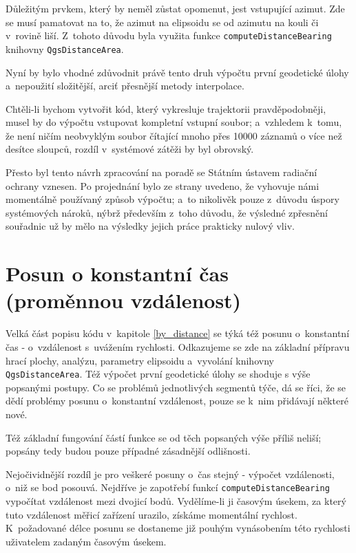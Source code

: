 Důležitým prvkem, který by neměl zůstat opomenut, jest vstupující azimut. Zde se musí pamatovat
na to, že azimut na elipsoidu se od azimutu na kouli či v~ro\-vině liší. Z~tohoto
důvodu byla využita funkce {\tt computeDistanceBearing} knihovny {\tt QgsDistanceArea}.

Nyní by bylo vhodné zdůvodnit právě tento druh výpočtu první geodetické úlohy a~nepoužití
složitější, arciť přesnější metody interpolace. 

Chtěli-li bychom vytvořit kód, který vykresluje trajektorii pravděpodobněji, mu\-sel by do
výpočtu vstupovat kompletní vstupní soubor; a~vzhledem k~tomu, že není ničím neobvyklým
soubor čítající mnoho přes 10000 záznamů o více než desítce sloupců, rozdíl v~systémové zátěži
by byl obrovský. 

Přesto byl tento návrh zpraco\-vá\-ní na poradě se Státním ústavem radiační ochra\-ny
vznesen. Po projednání bylo ze strany  uvedeno, že vyhovuje námi momentálně
používaný způsob výpočtu; a~to nikolivěk pouze z~důvodu úspory systémových nároků, nýbrž především
z~toho důvodu, že výsledné zpřesnění souřadnic už by mělo na výsledky jejich práce
prakticky nulový vliv. 

\section{Posun o konstantní čas (proměnnou vzdálenost)}
\label{by_seconds}

Velká část popisu kódu v~kapitole \ref{by_distance} se týká též posunu o~konstantní
čas - o~vzdále\-nost s~uvážením rychlosti. Odkazujeme se zde na základní přípravu hrací plochy,
analýzu, parametry elipsoidu a~vyvolání knihovny {\tt QgsDistanceArea}. Též výpočet první geodetické
úlohy se shoduje s výše popsanými postupy. Co se problémů jednotlivých
segmentů týče, dá se říci, že se dědí problémy posunu o~konstantní vzdálenost, pouze se k~nim
přidávají některé nové. 

Též základní fungování částí funkce se od těch popsaných výše příliš neliší; po\-psány tedy
budou pouze případné zásadnější odlišnosti. 

Nejočividnější rozdíl je pro veškeré posuny o~čas stejný - výpočet vzdálenosti,
o~niž se bod posouvá. Nejdříve je zapotřebí funkcí {\tt computeDistanceBearing}
vypočítat vzdálenost mezi dvojicí bodů. Vydělíme-li ji časovým úsekem, za který tuto vzdálenost
měřicí zařízení urazilo, získáme momentální rychlost. K~požadované délce posunu
se dostaneme již pouhým vynásobením této rychlosti uživatelem zadaným časovým úsekem. 

